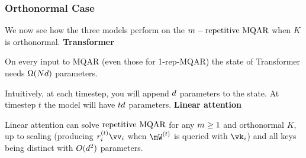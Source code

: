 \subsubsection{Orthonormal Case}
We now see how the three models perform on the $m-\text{repetitive MQAR}$ when $K$ is orthonormal.
\textbf{Transformer}
\begin{lemma}
On every input to MQAR (even those for 1-rep-MQAR) the state of Transformer needs $\Omega(Nd)$ parameters.
\end{lemma}
Intuitively, at each timestep, you will append $d$ parameters to the state. At timestep $t$ the model will have $td$ parameters.
\textbf{Linear attention}
\begin{theorem}\label{Orthogonal:LA}
Linear attention can solve $\text{repetitive MQAR}$ for any $m\ge1$ and orthonormal $K$, up to scaling (producing $r_{i}^{(\timestep)}\vv_{i}$ when $\mW^{(\timestep)}$ is queried with $\vk_i$) and all keys being distinct with $O(d^2)$ parameters.
\end{theorem}
